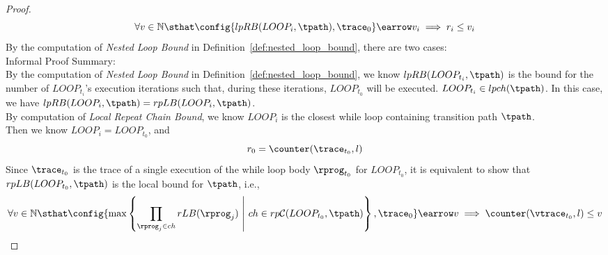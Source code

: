 \begin{proof}
% 
        \[
          \forall v \in \mathbb{N} \sthat 
          \config{lpRB(LOOP_i, \tpath), \trace_0
          } \earrow v_i 
          \implies  
          r_i \leq v_i
        \]   
  By the computation of \emph{Nested Loop Bound} in Definition~\ref{def:nested_loop_bound},
        there are two cases:
  \\
  Informal Proof Summary: 
  \\
  By the computation of \emph{Nested Loop Bound} in Definition~\ref{def:nested_loop_bound}, we know 
$lpRB(LOOP_{t_i}, \tpath)$ is the
bound for the number of $LOOP_{t_i}$'s execution iterations
such that, during these iterations, $LOOP_{t_0}$ will be executed. 
$LOOP_{t_i} \in lpch(\tpath)$.
%
        In this case, we have $lpRB(LOOP_i, \tpath) = rpLB(LOOP_i, \tpath)$.
        \\
        By computation of \emph{Local Repeat Chain Bound}, we know 
        $LOOP_i$ is the closest while loop containing transition path $\tpath$.
        \\
        Then we know $LOOP_i = LOOP_{t_0}$, and 
        \[
          r_0 = \counter(\trace_{t_0}, l)
        \]
    Since $\trace_{t_0}$ is the trace of a single execution of the while loop body $\rprog_{t_0}$ for $LOOP_{t_0}$,
    it is equivalent to show that $rpLB(LOOP_{t_0}, \tpath)$ is the local bound for $\tpath$, i.e.,
        \[
            \forall v \in \mathbb{N} \sthat
            \config{
        \max \left\{ \prod\limits_{\rprog_j \in ch}  rLB(\rprog_j) 
        ~\middle\vert~ ch \in rp\mathcal{C}(LOOP_{t_0}, \tpath) \right\}, \trace_0
          } \earrow v \implies  \counter(\vtrace_{t_0}, l) \leq v
        \]

\end{proof}
